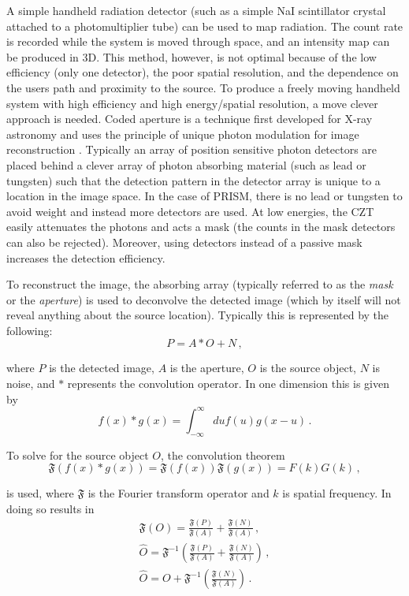 \documentclass[10pt]{article}
\begin{document}
A simple handheld radiation detector (such as a simple NaI scintillator crystal attached to a photomultiplier tube) can be used to map radiation. The count rate is recorded while the system is moved through space, and an intensity map can be produced in 3D. This method, however, is not optimal because of the low efficiency (only one detector), the poor spatial resolution, and the dependence on the users path and proximity to the source. To produce a freely moving handheld system with high efficiency and high energy/spatial resolution, a move clever approach is needed. Coded aperture is a technique first developed for X-ray astronomy and uses the principle of unique photon modulation for image reconstruction \cite{FenimoreCannon1978}. Typically an array of position sensitive photon detectors are placed behind a clever array of photon absorbing material (such as lead or tungsten) such that the detection pattern in the detector array is unique to a location in the image space. In the case of PRISM, there is no lead or tungsten to avoid weight and instead more detectors are used. At low energies, the CZT easily attenuates the photons and acts a mask (the counts in the mask detectors can also be rejected). Moreover, using detectors instead of a passive mask increases the detection efficiency.

To reconstruct the image, the absorbing array (typically referred to as the \emph{mask} or the \emph{aperture}) is used to deconvolve the detected image (which by itself will not reveal anything about the source location). Typically this is represented by the following:
%
\begin{equation}
	P = A \ast O + N\,,
\end{equation}

\noindent where $P$ is the detected image, $A$ is the aperture, $O$ is the source object, $N$ is noise, and $\ast$ represents the convolution operator. In one dimension this is given by
%
\begin{equation}
	f(x) \ast g(x) = \int_{-\infty}^\infty du f(u)g(x-u)\,.
\end{equation}

\noindent To solve for the source object $O$, the convolution theorem
%
\begin{equation}
	\mathfrak{F}(f(x) \ast g(x)) = \mathfrak{F}(f(x)) \mathfrak{F}(g(x)) = F(k)G(k)\,,
\end{equation}

\noindent is used, where $\mathfrak{F}$ is the Fourier transform operator and $k$ is spatial frequency. In doing so results in
%
\begin{align}
	\mathfrak{F}(O) = \frac{\mathfrak{F}(P)}{\mathfrak{F}(A)} + \frac{\mathfrak{F}(N)}{\mathfrak{F}(A)}\,,  \\
	\hat{O} = \mathfrak{F}^{-1}\left(\frac{\mathfrak{F}(P)}{\mathfrak{F}(A)} + \frac{\mathfrak{F}(N)}{\mathfrak{F}(A)}\right)\,, \\
	\hat{O} = O + \mathfrak{F}^{-1}\left( \frac{\mathfrak{F}(N)}{\mathfrak{F}(A)}\right)\,.
\end{align}
\end{document}
